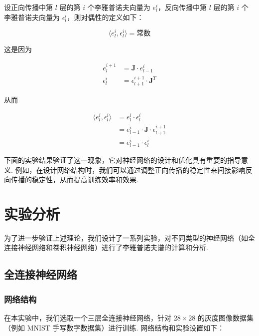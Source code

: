设正向传播中第 \(l\) 层的第 \(i\) 个李雅普诺夫向量为 \(e_{l}^{i}\)，反向传播中第 \(l\) 层的第 \(i\) 个李雅普诺夫向量为 \(\epsilon_{l}^{i}\)，则对偶性的定义如下：

\[
\langle e_{l}^{i}, \epsilon_{l}^{i} \rangle = \text{常数}
\]

这是因为

\begin{equation}
\begin{aligned}
  e_{l}^{i+1} &= \mathbf{J} \cdot e_{l-1}^{i} \\
  \epsilon_{l}^{i} &= \epsilon_{l+1}^{i+1} \cdot \mathbf{J}^T
\end{aligned}
\end{equation}

从而

\begin{equation}
\begin{aligned}
  \langle e_{l}^{i}, \epsilon_{l}^{i} \rangle &= e_{l}^{i} \cdot \epsilon_{l}^{i} \\
  &= e_{l-1}^{i} \cdot \mathbf{J} \cdot \epsilon_{l+1}^{i+1} \\
  &= e_{l-1}^{i} \cdot \epsilon_{l}^{i}
\end{aligned}
\end{equation}

下面的实验结果验证了这一现象，它对神经网络的设计和优化具有重要的指导意义. 例如，在设计网络结构时，我们可以通过调整正向传播的稳定性来间接影响反向传播的稳定性，从而提高训练效率和效果. 

\section{实验分析}

为了进一步验证上述理论，我们设计了一系列实验，对不同类型的神经网络（如全连接神经网络和卷积神经网络）进行了李雅普诺夫谱的计算和分析. 

\subsection{全连接神经网络}

\subsubsection{网络结构}

在本实验中，我们选取一个三层全连接神经网络，针对 $28\times 28$ 的灰度图像数据集（例如 MNIST 手写数字数据集）进行训练. 网络结构和实验设置如下：

